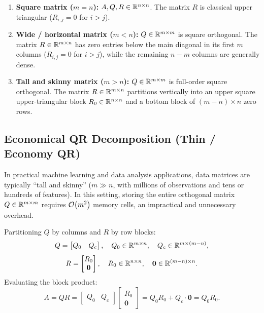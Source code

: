 \begin{enumerate}
    \item \textbf{Square matrix ($m = n$):}
    $A, Q, R \in \mathbb{R}^{n \times n}$. The matrix $R$ is classical upper triangular ($R_{i,j} = 0$ for $i > j$).
    \item \textbf{Wide / horizontal matrix ($m < n$):}
    $Q \in \mathbb{R}^{m \times m}$ is square orthogonal. The matrix $R \in \mathbb{R}^{m \times n}$ has zero entries below the main diagonal in its first $m$ columns ($R_{i,j} = 0$ for $i > j$), while the remaining $n - m$ columns are generally dense.
    \item \textbf{Tall and skinny matrix ($m > n$):}
    $Q \in \mathbb{R}^{m \times m}$ is full-order square orthogonal. The matrix $R \in \mathbb{R}^{m \times n}$ partitions vertically into an upper square upper-triangular block $R_0 \in \mathbb{R}^{n \times n}$ and a bottom block of $(m - n) \times n$ zero rows.
\end{enumerate}

\subsection{Economical QR Decomposition (Thin / Economy QR)}
In practical machine learning and data analysis applications, data matrices are typically ``tall and skinny'' ($m \gg n$, with millions of observations and tens or hundreds of features). In this setting, storing the entire orthogonal matrix $Q \in \mathbb{R}^{m \times m}$ requires $\mathcal{O}\!\left(m^2\right)$ memory cells, an impractical and unnecessary overhead.

Partitioning $Q$ by columns and $R$ by row blocks:
\begin{equation}
    Q = \begin{bmatrix} Q_0 & Q_c \end{bmatrix}, \quad Q_0 \in \mathbb{R}^{m \times n}, \quad Q_c \in \mathbb{R}^{m \times (m-n)},
\end{equation}
\begin{equation}
    R = \begin{bmatrix} R_0 \\ \mathbf{0} \end{bmatrix}, \quad R_0 \in \mathbb{R}^{n \times n}, \quad \mathbf{0} \in \mathbb{R}^{(m-n) \times n}.
\end{equation}
Evaluating the block product:
\begin{equation}
    A = Q R = \begin{bmatrix} Q_0 & Q_c \end{bmatrix} \begin{bmatrix} R_0 \\ \mathbf{0} \end{bmatrix} = Q_0 R_0 + Q_c \cdot \mathbf{0} = Q_0 R_0.
\end{equation}

